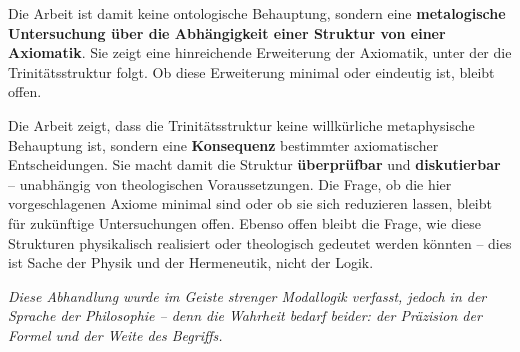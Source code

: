 \documentclass[
]{article}
\begin{document}
Die Arbeit ist damit keine ontologische Behauptung, sondern eine \textbf{metalogische Untersuchung über die Abhängigkeit einer Struktur von einer Axiomatik}. Sie zeigt eine hinreichende Erweiterung der Axiomatik, unter der die Trinitätsstruktur folgt. Ob diese Erweiterung minimal oder eindeutig ist, bleibt offen.

Die Arbeit zeigt, dass die Trinitätsstruktur keine willkürliche metaphysische Behauptung ist, sondern eine \textbf{Konsequenz} bestimmter axiomatischer Entscheidungen. Sie macht damit die Struktur \textbf{überprüfbar} und \textbf{diskutierbar} – unabhängig von theologischen Voraussetzungen. Die Frage, ob die hier vorgeschlagenen Axiome minimal sind oder ob sie sich reduzieren lassen, bleibt für zukünftige Untersuchungen offen. Ebenso offen bleibt die Frage, wie diese Strukturen physikalisch realisiert oder theologisch gedeutet werden könnten – dies ist Sache der Physik und der Hermeneutik, nicht der Logik.

\begin{center}
\emph{Diese Abhandlung wurde im Geiste strenger Modallogik verfasst, jedoch in der Sprache der Philosophie – denn die Wahrheit bedarf beider: der Präzision der Formel und der Weite des Begriffs.}
\end{center}
\end{document}
